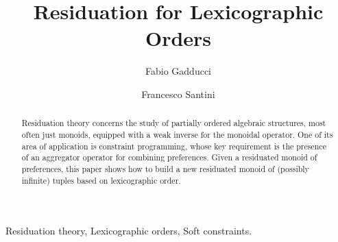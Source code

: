 \documentclass[a4paper]{elsarticle}
\newcommand{\1}{\mathbf{1}}
\begin{document}
\begin{frontmatter}





\title{Residuation for Lexicographic Orders}


		\author[pisa]{Fabio Gadducci}
		\author[perugia]{Francesco Santini}
		
		\address[pisa]{Dipartimento di Informatica, Universit{\`a} degli Studi di Pisa, Italy}	
		\address[perugia]{Dipartimento di Matematica e Informatica, Universit{\`a} degli Studi di Perugia, Italy}	



\begin{abstract} 
	Residuation theory concerns the study of partially ordered algebraic structures, most often just monoids,
	equipped with a weak inverse for the monoidal operator.
	One of its area of application is constraint programming, whose 
	key requirement is the presence of an aggregator operator for combining preferences.
	Given a residuated monoid of preferences, this paper shows how to build a new residuated monoid 
	of (possibly infinite) tuples based on lexicographic order. 
\end{abstract}
        \begin{keyword}
        	Residuation theory, Lexicographic orders, Soft constraints. %
        \end{keyword}
    \end{frontmatter}
\end{document}
